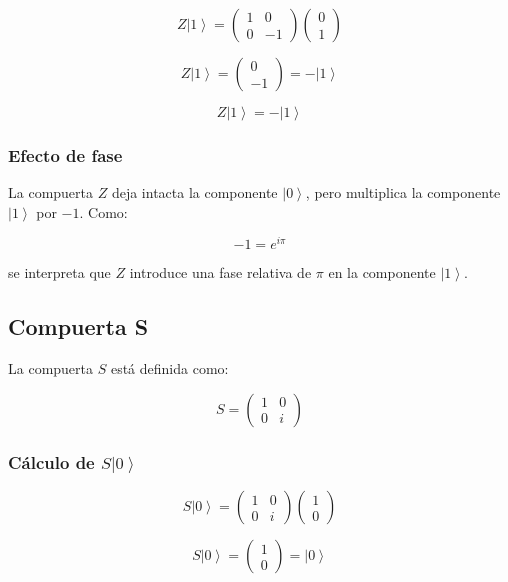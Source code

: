 \documentclass[12pt,a4paper]{article}
\newcommand{\ket}[1]{\left|#1\right\rangle}
\begin{document}
\[
Z\ket{1}
=
\begin{pmatrix}
1 & 0\\
0 & -1
\end{pmatrix}
\begin{pmatrix}
0\\
1
\end{pmatrix}
\]

\[
Z\ket{1}
=
\begin{pmatrix}
0\\
-1
\end{pmatrix}
=
-\ket{1}
\]

\begin{resultado}
\[
\boxed{Z\ket{1}=-\ket{1}}
\]
\end{resultado}

\subsubsection*{Efecto de fase}

La compuerta \(Z\) deja intacta la componente \(\ket{0}\), pero multiplica la componente \(\ket{1}\) por \(-1\). Como:

\[
-1=e^{i\pi}
\]

se interpreta que \(Z\) introduce una fase relativa de \(\pi\) en la componente \(\ket{1}\).

\subsection{Compuerta S}

La compuerta \(S\) está definida como:

\[
S=
\begin{pmatrix}
1 & 0\\
0 & i
\end{pmatrix}
\]

\subsubsection*{Cálculo de \texorpdfstring{$S\ket{0}$}{S ket 0}}

\[
S\ket{0}
=
\begin{pmatrix}
1 & 0\\
0 & i
\end{pmatrix}
\begin{pmatrix}
1\\
0
\end{pmatrix}
\]

\[
S\ket{0}
=
\begin{pmatrix}
1\\
0
\end{pmatrix}
=
\ket{0}
\]
\end{document}
